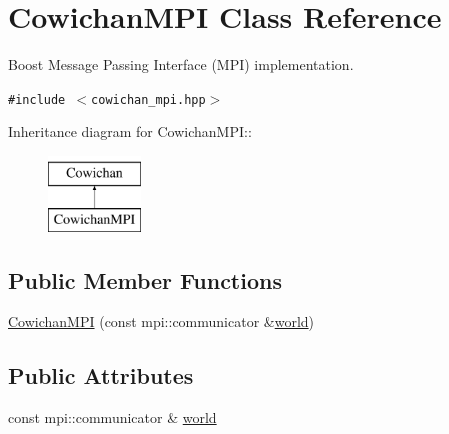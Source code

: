 \hypertarget{class_cowichan_m_p_i}{
\section{CowichanMPI Class Reference}
\label{class_cowichan_m_p_i}
}
Boost Message Passing Interface (MPI) implementation.  


{\tt \#include $<$cowichan\_\-mpi.hpp$>$}

Inheritance diagram for CowichanMPI::\begin{figure}[H]
\begin{center}
\leavevmode
\includegraphics[height=2cm]{class_cowichan_m_p_i}
\end{center}
\end{figure}
\subsection*{Public Member Functions}
\begin{CompactItemize}
\item 
\hyperlink{class_cowichan_m_p_i_ba4175b1aadbab75285b47819477dedf}{CowichanMPI} (const mpi::communicator \&\hyperlink{class_cowichan_m_p_i_cf8ae701dfbb7c17dcec165800c16969}{world})
\end{CompactItemize}
\subsection*{Public Attributes}
\begin{CompactItemize}
\item 
const mpi::communicator \& \hyperlink{class_cowichan_m_p_i_cf8ae701dfbb7c17dcec165800c16969}{world}
\end{CompactItemize}
